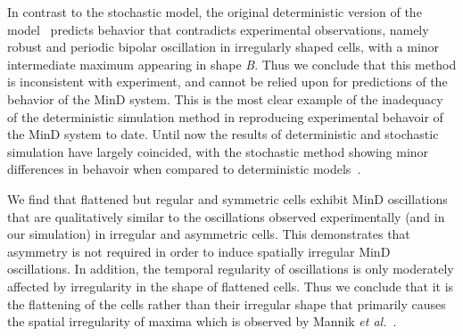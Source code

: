 \documentclass[letterpaper,twocolumn,amsmath,amssymb,pre]{revtex4-1}
\begin{document}
%

In contrast to the stochastic model, the original deterministic
version of the model~\cite{huang2003dynamic} predicts behavior that
contradicts experimental observations, namely robust and periodic
bipolar oscillation in irregularly shaped cells, with a minor
intermediate maximum appearing in shape \emph{B}.  Thus we conclude
that this method is inconsistent with experiment, and cannot be relied
upon for predictions of the behavior of the MinD system.  This is the
most clear example of the inadequacy of the deterministic simulation
method in reproducing experimental behavoir of the MinD system to
date.  Until now the results of deterministic and stochastic
simulation have largely coincided, with the stochastic method showing
minor differences in behavoir when compared to deterministic
models~\cite{kerr2006division, fange2006noise, huang2004min,
  kruse2007experimentalist}.

We find that flattened but regular and symmetric cells exhibit MinD
oscillations that are qualitatively similar to the oscillations
observed experimentally (and in our simulation) in irregular and
asymmetric cells.  This demonstrates that asymmetry is not required in
order to induce spatially irregular MinD oscillations.  In addition,
the temporal regularity of oscillations is only moderately affected by
irregularity in the shape of flattened cells.  Thus we conclude
that it is the flattening of the cells rather than their irregular
shape that primarily causes the spatial irregularity of maxima which
is observed by Mannik \emph{et al.}~\cite{mannik2012robustness}.



\end{document}
